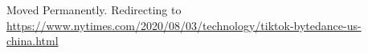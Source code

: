 Moved Permanently. Redirecting to
\href{https://www.nytimes.com/2020/08/03/technology/tiktok-bytedance-us-china.html}{https://www.nytimes.com/2020/08/03/technology/tiktok-bytedance-us-china.html}
